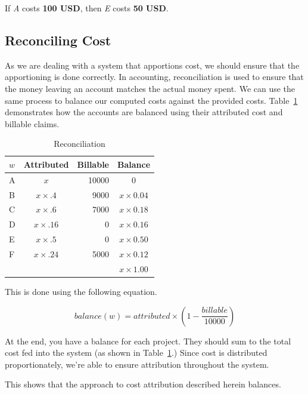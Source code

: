 \documentclass[10pt, a4paper, twocolumn]{article}
\begin{document}
      If \textit{A} costs \textbf{100 USD}, then \textit{E} costs \textbf{50 USD}.

  \subsection*{Reconciling Cost}
    As we are dealing with a system that apportions cost, we should ensure that the apportioning is done correctly.
    In accounting, reconciliation is used to ensure that the money leaving an account matches the actual money spent.
    We can use the same process to balance our computed costs against the provided costs.
    Table~\ref{table:1} demonstrates how the accounts are balanced using their attributed cost and billable claims.

    \begin{table}[H]
      \centering
      \begin{tabular}{ l|c|r|c }
        $w$ & Attributed       & Billable & Balance \\
        \hline
        A   & $ x            $ &    10000 & $ 0 $ \\
        B   & $ x \times .4  $ &     9000 & $ x \times 0.04 $ \\
        C   & $ x \times .6  $ &     7000 & $ x \times 0.18 $ \\
        D   & $ x \times .16 $ &        0 & $ x \times 0.16 $ \\
        E   & $ x \times .5  $ &        0 & $ x \times 0.50 $ \\
        F   & $ x \times .24 $ &     5000 & $ x \times 0.12 $ \\
        \hline
            &                  &          & $ x \times 1.00 $ \\
      \end{tabular}
      \caption{Reconciliation}
      \label{table:1}
    \end{table}

    This is done using the following equation.

    \[ balance(w) = attributed \times \left(1 - \frac{billable}{10000}\right) \]

    At the end, you have a balance for each project.
    They should sum to the total cost fed into the system (as shown in Table~\ref{table:1}.)
    Since cost is distributed proportionately, we're able to ensure attribution throughout the system.

    This shows that the approach to cost attribution described herein balances.
\end{document}
